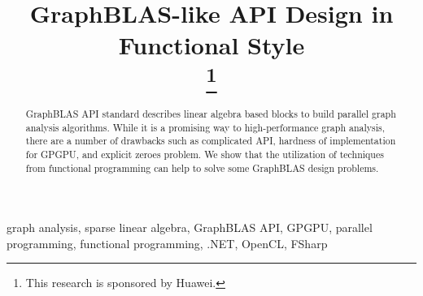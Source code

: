 \documentclass[conference]{IEEEtran}
\begin{document}
\makeatletter %
\newcommand{\linebreakand}{%
  \end{@IEEEauthorhalign}
  \hfill\mbox{}\par
  \mbox{}\hfill\begin{@IEEEauthorhalign}
}
\makeatother %


\title{GraphBLAS-like API Design in Functional Style\\
\thanks{This research is sponsored by Huawei.}
}

\author{
}


\maketitle

\begin{abstract}
    GraphBLAS API standard describes linear algebra based blocks to build parallel graph analysis algorithms.
    While it is a promising way to high-performance graph analysis, there are a number of drawbacks such as complicated API, hardness of implementation for GPGPU, and explicit zeroes problem.
    We show that the utilization of techniques from functional programming can help to solve some GraphBLAS design problems.
\end{abstract}

\begin{IEEEkeywords}
graph analysis, sparse linear algebra, GraphBLAS API, GPGPU, parallel programming, functional programming, .NET, OpenCL, FSharp
\end{IEEEkeywords}



%

%



%




\end{document}
